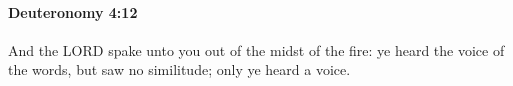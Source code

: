 
		\paragraph{Deuteronomy 4:12} %
			\label{DEUTERONOMY-4-12}

			And the LORD spake unto you out of the midst of the fire: ye heard the voice of the words, but saw no similitude; only ye heard a voice.


